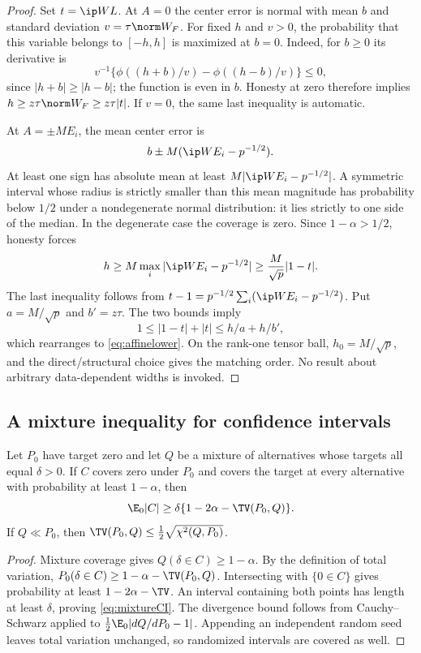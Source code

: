 \begin{proof}
Set $t=\ip WL$. At $A=0$ the center error is normal with mean $b$ and standard deviation $v=\tau\norm W_F$. For fixed $h$ and $v>0$, the probability that this variable belongs to $[-h,h]$ is maximized at $b=0$. Indeed, for $b\ge0$ its derivative is
\[
 v^{-1}\{\phi((h+b)/v)-\phi((h-b)/v)\}\le0,
\]
since $|h+b|\ge|h-b|$; the function is even in $b$. Honesty at zero therefore implies $h\ge z\tau\norm W_F\ge z\tau|t|$. If $v=0$, the same last inequality is automatic.

At $A=\pm M E_i$, the mean center error is
\[
 b\pm M(\ip W{E_i}-p^{-1/2}).
\]
At least one sign has absolute mean at least $M|\ip W{E_i}-p^{-1/2}|$. A symmetric interval whose radius is strictly smaller than this mean magnitude has probability below $1/2$ under a nondegenerate normal distribution: it lies strictly to one side of the median. In the degenerate case the coverage is zero. Since $1-\alpha>1/2$, honesty forces
\[
 h\ge M\max_i|\ip W{E_i}-p^{-1/2}|
 \ge\frac M{\sqrt p}|1-t|.
\]
The last inequality follows from $t-1=p^{-1/2}\sum_i(\ip W{E_i}-p^{-1/2})$. Put $a=M/\sqrt p$ and $b'=z\tau$. The two bounds imply
\[
 1\le|1-t|+|t|\le h/a+h/b',
\]
which rearranges to \eqref{eq:affinelower}. On the rank-one tensor ball, $h_0=M/\sqrt p$, and the direct/structural choice gives the matching order. No result about arbitrary data-dependent widths is invoked.
\end{proof}

\subsection{A mixture inequality for confidence intervals}

\begin{lemma}\label{lem:mixture}
Let $P_0$ have target zero and let $Q$ be a mixture of alternatives whose targets all equal $\delta>0$. If $C$ covers zero under $P_0$ and covers the target at every alternative with probability at least $1-\alpha$, then
\begin{equation}\label{eq:mixtureCI}
 \E_0|C|\ge\delta\{1-2\alpha-\TV(P_0,Q)\}.
\end{equation}
If $Q\ll P_0$, then $\TV(P_0,Q)\le\frac12\sqrt{\chi^2(Q,P_0)}$.
\end{lemma}

\begin{proof}
Mixture coverage gives $Q(\delta\in C)\ge1-\alpha$. By the definition of total variation, $P_0(\delta\in C)\ge1-\alpha-\TV(P_0,Q)$. Intersecting with $\{0\in C\}$ gives probability at least $1-2\alpha-\TV$. An interval containing both points has length at least $\delta$, proving \eqref{eq:mixtureCI}. The divergence bound follows from Cauchy--Schwarz applied to $\frac12\E_0|dQ/dP_0-1|$. Appending an independent random seed leaves total variation unchanged, so randomized intervals are covered as well.
\end{proof}

